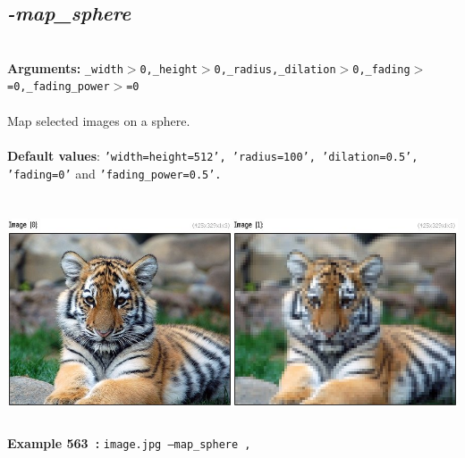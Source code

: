 \documentclass[a4paper,11pt,twoside]{book}
\begin{document}
\subsection{\emph{-map\_sphere} }\vspace*{-0.5em}
~\\\textbf{Arguments: } 
{\small \texttt{\_width$>$0,\_height$>$0,\_radius,\_dilation$>$0,\_fading$>$=0,\_fading\_power$>$=0}}\\~\\
Map selected images on a sphere.
~\\~\\\textbf{Default values}: {\small \texttt{'width=height=512', 'radius=100', 'dilation=0.5', 'fading=0'} and \texttt{'fading\_power=0.5'.}}
\begin{center}\includegraphics[keepaspectratio=true,height=7cm,width=\textwidth]{img/gmic_def563.jpg}\\
{\footnotesize \textbf{Example 563~:} \texttt{image.jpg --map\_sphere ,}}
\end{center}
\end{document}
